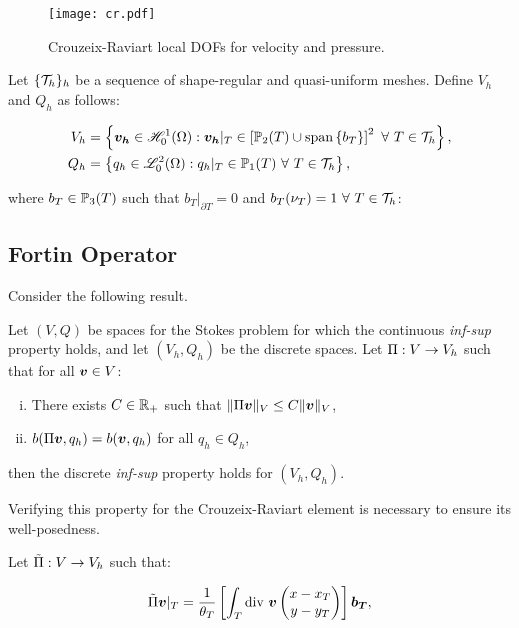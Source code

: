 \begin{figure}[!ht]
	\centering
	\texttt{[image: cr.pdf]}
	\caption{Crouzeix-Raviart local DOFs for velocity and pressure.}
\end{figure}

Let $\{\mathcal{T}_h\}_h$ be a sequence of shape-regular and quasi-uniform meshes. Define $V_h$ and $Q_h$ as follows:

\begin{align}
    V_h &= \left\{ \bm{v_h} \in \mathscr{H}^1_0(\Omega): \bm{v_h} \vert_T \in \left[ \mathbb{P}_{2}(T) \cup \text{span} \left\{ b_T \right\} \right]^2 ~ \forall ~ T \in \mathcal{T}_h \right\}, \\
    Q_h &= \left\{ q_h \in \mathscr{L}^2_0(\Omega): q_h \vert_T \in \mathbb{P}_{1}(T) ~ \forall ~ T \in \mathcal{T}_h \right\},
\end{align}

where $b_T \in \mathbb{P}_{3}(T)$ such that $b_T \vert_{\partial T} = 0$ and $b_T(\nu_T) = 1 ~ \forall ~ T \in \mathcal{T}_h$:

\subsection{Fortin Operator}

Consider the following result.

\begin{lemma}[Fortin] \label{fortin}
    Let $(V, Q)$ be spaces for the Stokes problem for which the continuous \textit{inf-sup} property holds, and let $(V_h, Q_h)$ be the discrete spaces. Let $\Pi: V \rightarrow V_h$ such that for all $\bm{v} \in V$:
    \begin{enumerate}[i.]
        \item There exists $C \in \mathbb{R}_+$ such that $\lVert \Pi \bm{v} \rVert_V \leq C \lVert \bm{v} \rVert_V$,
        \item $b(\Pi \bm{v}, q_h) = b(\bm{v}, q_h)$ for all $q_h \in Q_h$,
    \end{enumerate}
    then the discrete \textit{inf-sup} property holds for $(V_h, Q_h)$.
\end{lemma}

Verifying this property for the Crouzeix-Raviart element is necessary to ensure its well-posedness.

\newpage
\noindent Let $\tilde{\Pi}: V \rightarrow V_h$ such that:

\begin{gather}
    \tilde{\Pi} \bm{v} \vert_T = \frac{1}{\theta_T} \left[ \int_T \text{div } \bm{v} \begin{pmatrix}
        x - x_T \\
        y - y_T
    \end{pmatrix} \right] \bm{b_T},
\end{gather}

